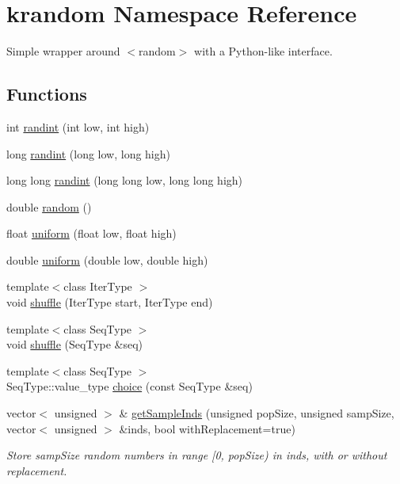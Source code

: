 \hypertarget{namespacekrandom}{\section{krandom Namespace Reference}
\label{namespacekrandom}
}


Simple wrapper around {\ttfamily $<$random$>$} with a Python-\/like interface.  


\subsection*{Functions}
\begin{DoxyCompactItemize}
\item 
int \hyperlink{namespacekrandom_a32b7337c1131ea0fbbd6b5f20aac2002}{randint} (int low, int high)
\item 
long \hyperlink{namespacekrandom_adc8e2bfa37c40fdecc8f601a266ab447}{randint} (long low, long high)
\item 
long long \hyperlink{namespacekrandom_a4672262133b6b130d7ca8b49f55595a2}{randint} (long long low, long long high)
\item 
double \hyperlink{namespacekrandom_a6a320147afafc7e81429b1a1ab4ec2e0}{random} ()
\item 
float \hyperlink{namespacekrandom_aa5f77704c3bf39731c986b7d27caf0fe}{uniform} (float low, float high)
\item 
double \hyperlink{namespacekrandom_ae89a756b3d067650aa9712efe6e930e2}{uniform} (double low, double high)
\item 
{\footnotesize template$<$class Iter\-Type $>$ }\\void \hyperlink{namespacekrandom_abac374525fd029faa58cb9c43cab41eb}{shuffle} (Iter\-Type start, Iter\-Type end)
\item 
{\footnotesize template$<$class Seq\-Type $>$ }\\void \hyperlink{namespacekrandom_a3cf920703fa6e180b1aa4d4c86799626}{shuffle} (Seq\-Type \&seq)
\item 
{\footnotesize template$<$class Seq\-Type $>$ }\\Seq\-Type\-::value\-\_\-type \hyperlink{namespacekrandom_ae031164eba3b0311cbae22aed8894898}{choice} (const Seq\-Type \&seq)
\item 
vector$<$ unsigned $>$ \& \hyperlink{namespacekrandom_a50015c42a5cb2ab60017b00abbb4ffde}{get\-Sample\-Inds} (unsigned pop\-Size, unsigned samp\-Size, vector$<$ unsigned $>$ \&inds, bool with\-Replacement=true)
\begin{DoxyCompactList}\small\item\em Store {\ttfamily samp\-Size} random numbers in range \mbox{[}0, {\ttfamily pop\-Size}) in {\ttfamily inds}, with or without replacement. \end{DoxyCompactList}\item 

\end{DoxyCompactItemize}
